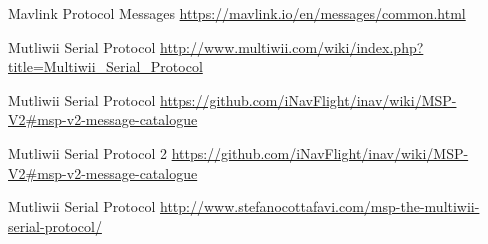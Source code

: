 \documentclass{report}
\begin{document}
\cleardoublepage

\begin{thebibliography}{9}


Mavlink Protocol Messages
\url{https://mavlink.io/en/messages/common.html}

Mutliwii Serial Protocol
\url{http://www.multiwii.com/wiki/index.php?title=Multiwii_Serial_Protocol}

Mutliwii Serial Protocol
\url{https://github.com/iNavFlight/inav/wiki/MSP-V2#msp-v2-message-catalogue}

Mutliwii Serial Protocol 2
\url{ https://github.com/iNavFlight/inav/wiki/MSP-V2#msp-v2-message-catalogue}




Mutliwii Serial Protocol
\url{http://www.stefanocottafavi.com/msp-the-multiwii-serial-protocol/}






\appendix
\end{thebibliography}
\cleardoublepage
\end{document}
